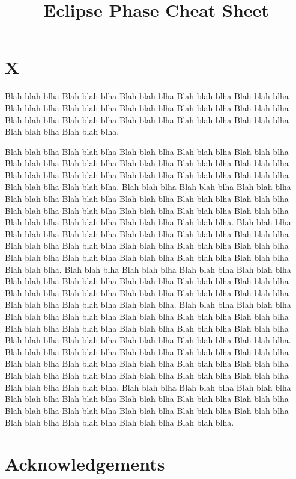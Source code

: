 \documentclass[landscape,twocolumn,a4]{article}
\begin{document}
\title{Eclipse Phase Cheat Sheet}


\section{X}

Blah blah blha Blah blah blha Blah blah blha Blah blah blha Blah blah blha
Blah blah blha Blah blah blha Blah blah blha Blah blah blha Blah blah blha
Blah blah blha Blah blah blha Blah blah blha Blah blah blha Blah blah blha
Blah blah blha Blah blah blha.

Blah blah blha Blah blah blha Blah blah blha Blah blah blha Blah blah blha
Blah blah blha Blah blah blha Blah blah blha Blah blah blha Blah blah blha
Blah blah blha Blah blah blha Blah blah blha Blah blah blha Blah blah blha
Blah blah blha Blah blah blha.
Blah blah blha Blah blah blha Blah blah blha Blah blah blha Blah blah blha
Blah blah blha Blah blah blha Blah blah blha Blah blah blha Blah blah blha
Blah blah blha Blah blah blha Blah blah blha Blah blah blha Blah blah blha
Blah blah blha Blah blah blha.
Blah blah blha Blah blah blha Blah blah blha Blah blah blha Blah blah blha
Blah blah blha Blah blah blha Blah blah blha Blah blah blha Blah blah blha
Blah blah blha Blah blah blha Blah blah blha Blah blah blha Blah blah blha
Blah blah blha Blah blah blha.
Blah blah blha Blah blah blha Blah blah blha Blah blah blha Blah blah blha
Blah blah blha Blah blah blha Blah blah blha Blah blah blha Blah blah blha
Blah blah blha Blah blah blha Blah blah blha Blah blah blha Blah blah blha
Blah blah blha Blah blah blha.
Blah blah blha Blah blah blha Blah blah blha Blah blah blha Blah blah blha
Blah blah blha Blah blah blha Blah blah blha Blah blah blha Blah blah blha
Blah blah blha Blah blah blha Blah blah blha Blah blah blha Blah blah blha
Blah blah blha Blah blah blha.
Blah blah blha Blah blah blha Blah blah blha Blah blah blha Blah blah blha
Blah blah blha Blah blah blha Blah blah blha Blah blah blha Blah blah blha
Blah blah blha Blah blah blha Blah blah blha Blah blah blha Blah blah blha
Blah blah blha Blah blah blha.
Blah blah blha Blah blah blha Blah blah blha Blah blah blha Blah blah blha
Blah blah blha Blah blah blha Blah blah blha Blah blah blha Blah blah blha
Blah blah blha Blah blah blha Blah blah blha Blah blah blha Blah blah blha
Blah blah blha Blah blah blha.

\section{Acknowledgements}
\end{document}
